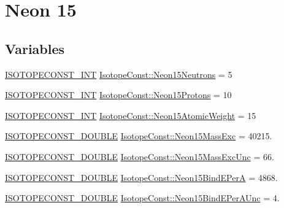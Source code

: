 \hypertarget{group___isotope_const-_neon-_ne15}{}\section{Neon 15}
\label{group___isotope_const-_neon-_ne15}
\subsection*{Variables}
\begin{DoxyCompactItemize}
\item 
\mbox{\hyperlink{group___isotope_const-_macros_ga5f18360b3e99483a35c32d789e62621c}{I\+S\+O\+T\+O\+P\+E\+C\+O\+N\+S\+T\+\_\+\+I\+NT}} \mbox{\hyperlink{group___isotope_const-_neon-_ne15_gae56389b02cd267944c23afd7e66707e1}{Isotope\+Const\+::\+Neon15\+Neutrons}} = 5
\item 
\mbox{\hyperlink{group___isotope_const-_macros_ga5f18360b3e99483a35c32d789e62621c}{I\+S\+O\+T\+O\+P\+E\+C\+O\+N\+S\+T\+\_\+\+I\+NT}} \mbox{\hyperlink{group___isotope_const-_neon-_ne15_ga73a8a93adcfdea8d2937cf360e93dacd}{Isotope\+Const\+::\+Neon15\+Protons}} = 10
\item 
\mbox{\hyperlink{group___isotope_const-_macros_ga5f18360b3e99483a35c32d789e62621c}{I\+S\+O\+T\+O\+P\+E\+C\+O\+N\+S\+T\+\_\+\+I\+NT}} \mbox{\hyperlink{group___isotope_const-_neon-_ne15_ga56bd3674cddc38da86d5099f26ece0e9}{Isotope\+Const\+::\+Neon15\+Atomic\+Weight}} = 15
\item 
\mbox{\hyperlink{group___isotope_const-_macros_ga8f45a7272ce02c0b4c65c44636ed719a}{I\+S\+O\+T\+O\+P\+E\+C\+O\+N\+S\+T\+\_\+\+D\+O\+U\+B\+LE}} \mbox{\hyperlink{group___isotope_const-_neon-_ne15_ga00c83078c420db04c40faa3ed772bc17}{Isotope\+Const\+::\+Neon15\+Mass\+Exc}} = 40215.
\item 
\mbox{\hyperlink{group___isotope_const-_macros_ga8f45a7272ce02c0b4c65c44636ed719a}{I\+S\+O\+T\+O\+P\+E\+C\+O\+N\+S\+T\+\_\+\+D\+O\+U\+B\+LE}} \mbox{\hyperlink{group___isotope_const-_neon-_ne15_ga22634b34fa2aaf4124a1fbe2a309a0ed}{Isotope\+Const\+::\+Neon15\+Mass\+Exc\+Unc}} = 66.
\item 
\mbox{\hyperlink{group___isotope_const-_macros_ga8f45a7272ce02c0b4c65c44636ed719a}{I\+S\+O\+T\+O\+P\+E\+C\+O\+N\+S\+T\+\_\+\+D\+O\+U\+B\+LE}} \mbox{\hyperlink{group___isotope_const-_neon-_ne15_ga3b35890dd20394ea7b284864b7a23eec}{Isotope\+Const\+::\+Neon15\+Bind\+E\+PerA}} = 4868.
\item 
\mbox{\hyperlink{group___isotope_const-_macros_ga8f45a7272ce02c0b4c65c44636ed719a}{I\+S\+O\+T\+O\+P\+E\+C\+O\+N\+S\+T\+\_\+\+D\+O\+U\+B\+LE}} \mbox{\hyperlink{group___isotope_const-_neon-_ne15_ga49f8bdd779045a0cc1beff3660d6e192}{Isotope\+Const\+::\+Neon15\+Bind\+E\+Per\+A\+Unc}} = 4.

\end{DoxyCompactItemize}

